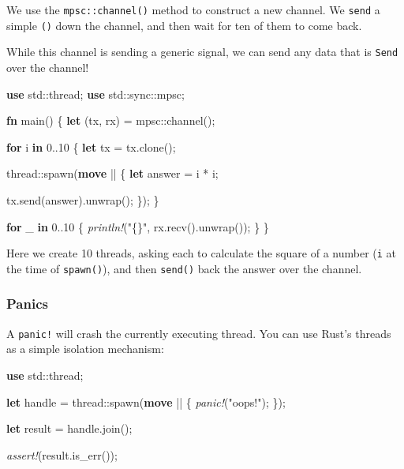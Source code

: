 \documentclass[a4paper,]{book}
\newenvironment{Shaded}{\begin{snugshade}}{\end{snugshade}}
\newcommand{\KeywordTok}[1]{\textcolor[rgb]{0.13,0.29,0.53}{\textbf{{#1}}}}
\newcommand{\DecValTok}[1]{\textcolor[rgb]{0.00,0.00,0.81}{{#1}}}
\newcommand{\StringTok}[1]{\textcolor[rgb]{0.31,0.60,0.02}{{#1}}}
\newcommand{\PreprocessorTok}[1]{\textcolor[rgb]{0.56,0.35,0.01}{\textit{{#1}}}}
\newcommand{\NormalTok}[1]{{#1}}
\begin{document}
We use the \texttt{mpsc::channel()} method to construct a new channel.
We \texttt{send} a simple \texttt{()} down the channel, and then wait
for ten of them to come back.

While this channel is sending a generic signal, we can send any data
that is \texttt{Send} over the channel!

\begin{Shaded}
\begin{Highlighting}[]
\KeywordTok{use} \NormalTok{std::thread;}
\KeywordTok{use} \NormalTok{std::sync::mpsc;}

\KeywordTok{fn} \NormalTok{main() \{}
    \KeywordTok{let} \NormalTok{(tx, rx) = mpsc::channel();}

    \KeywordTok{for} \NormalTok{i }\KeywordTok{in} \DecValTok{0.}\NormalTok{.}\DecValTok{10} \NormalTok{\{}
        \KeywordTok{let} \NormalTok{tx = tx.clone();}

        \NormalTok{thread::spawn(}\KeywordTok{move} \NormalTok{|| \{}
            \KeywordTok{let} \NormalTok{answer = i * i;}

            \NormalTok{tx.send(answer).unwrap();}
        \NormalTok{\});}
    \NormalTok{\}}

    \KeywordTok{for} \NormalTok{_ }\KeywordTok{in} \DecValTok{0.}\NormalTok{.}\DecValTok{10} \NormalTok{\{}
        \PreprocessorTok{println!}\NormalTok{(}\StringTok{"\{\}"}\NormalTok{, rx.recv().unwrap());}
    \NormalTok{\}}
\NormalTok{\}}
\end{Highlighting}
\end{Shaded}

Here we create 10 threads, asking each to calculate the square of a
number (\texttt{i} at the time of \texttt{spawn()}), and then
\texttt{send()} back the answer over the channel.

\subsubsection{Panics}\label{panics}

A \texttt{panic!} will crash the currently executing thread. You can use
Rust's threads as a simple isolation mechanism:

\begin{Shaded}
\begin{Highlighting}[]
\KeywordTok{use} \NormalTok{std::thread;}

\KeywordTok{let} \NormalTok{handle = thread::spawn(}\KeywordTok{move} \NormalTok{|| \{}
    \PreprocessorTok{panic!}\NormalTok{(}\StringTok{"oops!"}\NormalTok{);}
\NormalTok{\});}

\KeywordTok{let} \NormalTok{result = handle.join();}

\PreprocessorTok{assert!}\NormalTok{(result.is_err());}
\end{Highlighting}
\end{Shaded}
\end{document}
